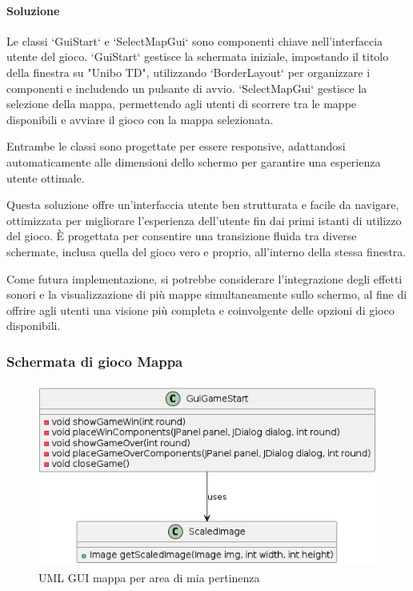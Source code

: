 \documentclass[a4paper,12pt]{report}
\begin{document}
\paragraph{Soluzione} Le classi `GuiStart` e `SelectMapGui` sono componenti chiave nell'interfaccia utente del gioco. `GuiStart` gestisce la schermata iniziale, impostando il titolo della finestra su "Unibo TD", utilizzando `BorderLayout` per organizzare i componenti e includendo un pulsante di avvio. `SelectMapGui` gestisce la selezione della mappa, permettendo agli utenti di scorrere tra le mappe disponibili e avviare il gioco con la mappa selezionata.

Entrambe le classi sono progettate per essere responsive, adattandosi automaticamente alle dimensioni dello schermo per garantire una esperienza utente ottimale.

Questa soluzione offre un'interfaccia utente ben strutturata e facile da navigare, ottimizzata per migliorare l'esperienza dell'utente fin dai primi istanti di utilizzo del gioco. È progettata per consentire una transizione fluida tra diverse schermate, inclusa quella del gioco vero e proprio, all'interno della stessa finestra.

Come futura implementazione, si potrebbe considerare l'integrazione degli effetti sonori e la visualizzazione di più mappe simultaneamente sullo schermo, al fine di offrire agli utenti una visione più completa e coinvolgente delle opzioni di gioco disponibili.

\subsubsection{Schermata di gioco Mappa}

\begin{figure}[H]
    \centering
    \includegraphics[scale=1]{GuiGameStart}
    \caption{UML GUI mappa per area di mia pertinenza}
    \label{fig:gameStart}
\end{figure}
\end{document}
